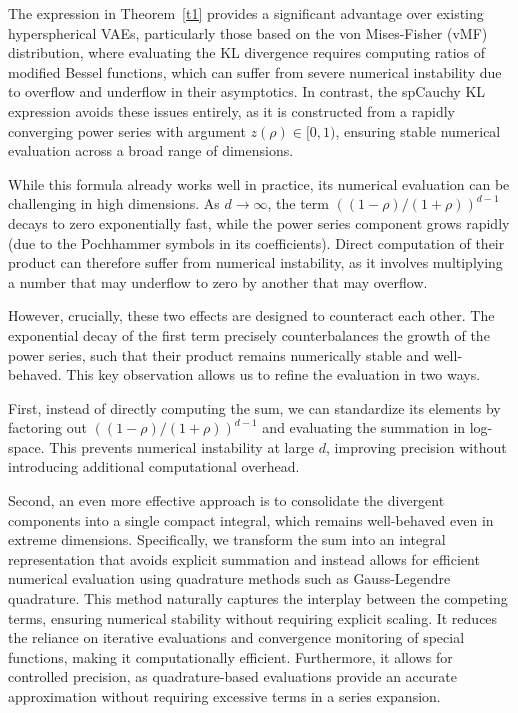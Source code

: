 \documentclass{article}
\begin{document}
The expression in Theorem~\ref{t1} provides a significant advantage over existing hyperspherical VAEs, particularly those based on the von Mises-Fisher (vMF) distribution, where evaluating the KL divergence requires computing ratios of modified Bessel functions, which can suffer from severe numerical instability due to overflow and underflow in their asymptotics. In contrast, the spCauchy KL expression avoids these issues entirely, as it is constructed from a rapidly converging power series with argument \( z(\rho) \in [0,1) \), ensuring stable numerical evaluation across a broad range of dimensions.

While this formula already works well in practice, its numerical evaluation can be challenging in high dimensions. As \( d \to \infty \), the term \(\left((1-\rho)/(1+\rho)\right)^{d-1}\) decays to zero exponentially fast, while the power series component grows rapidly (due to the Pochhammer symbols in its coefficients). Direct computation of their product can therefore suffer from numerical instability, as it involves multiplying a number that may underflow to zero by another that may overflow.

However, crucially, these two effects are designed to counteract each other. The exponential decay of the first term precisely counterbalances the growth of the power series, such that their product remains numerically stable and well-behaved. This key observation allows us to refine the evaluation in two ways.

First, instead of directly computing the sum, we can standardize its elements by factoring out \(\left((1-\rho)/(1+\rho)\right)^{d-1}\) and evaluating the summation in log-space. This prevents numerical instability at large \( d \), improving precision without introducing additional computational overhead.

Second, an even more effective approach is to consolidate the divergent components into a single compact integral, which remains well-behaved even in extreme dimensions. Specifically, we transform the sum into an integral representation that avoids explicit summation and instead allows for efficient numerical evaluation using quadrature methods such as Gauss-Legendre quadrature. This method naturally captures the interplay between the competing terms, ensuring numerical stability without requiring explicit scaling. It reduces the reliance on iterative evaluations and convergence monitoring of special functions, making it computationally efficient. Furthermore, it allows for controlled precision, as quadrature-based evaluations provide an accurate approximation without requiring excessive terms in a series expansion.
\end{document}
